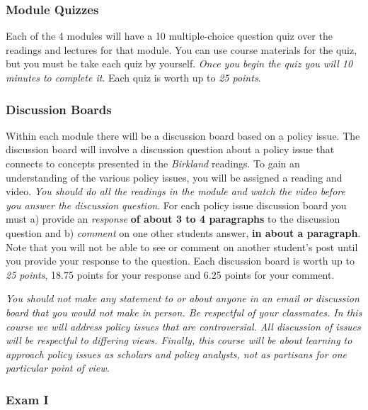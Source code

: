 \hypertarget{module-quizzes}{%
\subsubsection{Module Quizzes}\label{module-quizzes}}

Each of the 4 modules will have a 10 multiple-choice question quiz over
the readings and lectures for that module. You can use course materials
for the quiz, but you must be take each quiz by yourself. \emph{Once you
begin the quiz you will 10 minutes to complete it}. Each quiz is worth
up to \emph{25 points}.

\hypertarget{discussion-boards}{%
\subsubsection{Discussion Boards}\label{discussion-boards}}

Within each module there will be a discussion board based on a policy
issue. The discussion board will involve a discussion question about a
policy issue that connects to concepts presented in the \emph{Birkland}
readings. To gain an understanding of the various policy issues, you
will be assigned a reading and video. \emph{You should do all the
readings in the module and watch the video before you answer the
discussion question}. For each policy issue discussion board you must a)
provide an \emph{response} \textbf{of about 3 to 4 paragraphs} to the
discussion question and b) \emph{comment} on one other students answer,
\textbf{in about a paragraph}. Note that you will not be able to see or
comment on another student's post until you provide your response to the
question. Each discussion board is worth up to \emph{25 points}, 18.75
points for your response and 6.25 points for your comment.

\vspace{0.1in}

\noindent \emph{You should not make any statement to or about anyone in
an email or discussion board that you would not make in person. Be
respectful of your classmates. In this course we will address policy
issues that are controversial. All discussion of issues will be
respectful to differing views. Finally, this course will be about
learning to approach policy issues as scholars and policy analysts, not
as partisans for one particular point of view.}

\hypertarget{exam-i}{%
\subsubsection{Exam I}\label{exam-i}}

